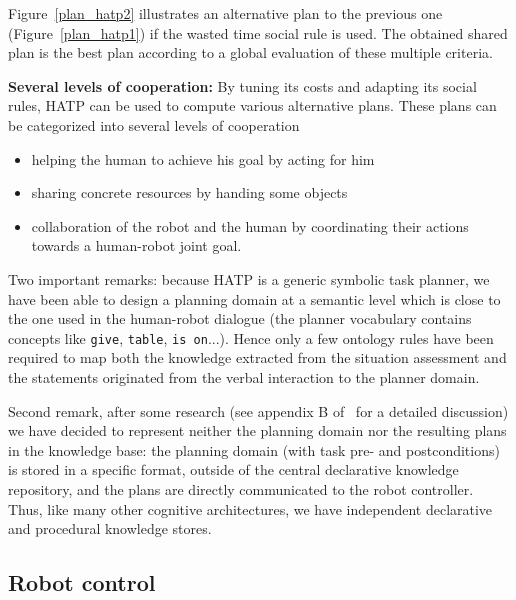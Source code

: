 \documentclass[preprint,12pt]{elsarticle}
\begin{document}
Figure~\ref{plan_hatp2} illustrates an alternative plan to the previous 
one (Figure~\ref{plan_hatp1}) if the wasted time social rule is used.
The obtained shared plan is the best plan according to a global evaluation of
these multiple criteria.

\vspace{0.3cm}
\noindent
\textbf{Several levels of cooperation:} 
By tuning its costs
and adapting its social rules, HATP can be used to compute various
alternative plans. These plans can be categorized into several levels
of cooperation

\begin{itemize}
\item helping the human to achieve his goal by acting for him
\item sharing concrete resources by handing some objects
\item collaboration of the robot and the human by coordinating their
  actions towards a human-robot joint goal.
\end{itemize}



Two important remarks: because HATP is a generic symbolic task planner, we have
been able to design a planning domain at a semantic level which is close to the
one used in the human-robot dialogue (the planner vocabulary contains concepts
like \texttt{give}, \texttt{table}, \texttt{is on}...). Hence only a few
ontology rules have been required to map both the knowledge extracted from the
situation assessment and the statements originated from the verbal interaction
to the planner domain.

Second remark, after some research (see appendix B of~\cite{Lemaignan2012a} for
a detailed discussion)  we have decided to represent neither the planning
domain nor the resulting plans in the knowledge base: the planning domain (with
task pre- and postconditions) is stored in a specific format, outside of the
central declarative knowledge repository, and the plans are directly
communicated to the robot controller. Thus, like many other cognitive
architectures, we have independent declarative and procedural knowledge stores.


\subsection{Robot control}
\label{sect|ctrl}
\end{document}
